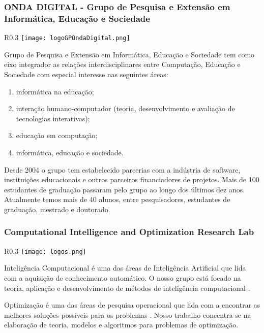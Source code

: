 \subsubsection{ONDA DIGITAL - Grupo de Pesquisa e Extensão em Informática, Educação e Sociedade}
\begin{wrapfigure}{R}{0.3\textwidth}
            \centering
            \texttt{[image: logoGPOndaDigital.png]}
        \end{wrapfigure}
Grupo de Pesquisa e Extensão em Informática, Educação e Sociedade tem como eixo integrador as relações interdisciplinares entre Computação, Educação e Sociedade com especial interesse nas seguintes áreas: 
\begin{enumerate}
\item informática na educação; 
\item  interação humano-computador (teoria, desenvolvimento e avaliação de tecnologias interativas); 
\item educação em computação; 
\item informática, educação e sociedade.
\end{enumerate}

Desde 2004 o grupo tem estabelecido parcerias com a indústria de software, instituições educacionais e outros parceiros financiadores de projetos. Mais de 100 estudantes de graduação passaram pelo grupo ao longo dos últimos dez anos. Atualmente temos mais de 40 alunos, entre pesquisadores, estudantes de graduação, mestrado e doutorado.

\subsubsection{Computational Intelligence and Optimization Research Lab}
\begin{wrapfigure}{R}{0.3\textwidth}
            \centering
            \texttt{[image: logos.png]}
        \end{wrapfigure}
Inteligência Computacional é uma das áreas de Inteligência Artificial que lida com a aquisição de conhecimento automático. O nosso grupo está focado na teoria, aplicação e desenvolvimento de métodos de inteligência computacional .
	  
	  Optimização é uma das áreas de pesquisa operacional que lida com a encontrar as melhores soluções possíveis para os problemas . Nosso trabalho concentra-se na elaboração de teoria, modelos e algoritmos para problemas de optimização.